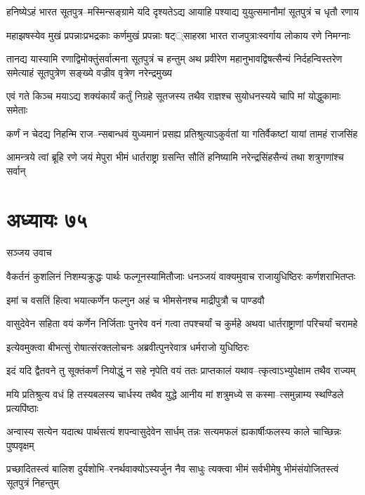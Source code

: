 \twolineshloka
{हनिष्येऽहं भारत सूतपुत्र--मस्मिन्सङ्ग्रामे यदि दृश्यतेऽद्य}
{आयाहि पश्याद्य युयुत्समानौमां सूतपुत्रं च धृतौ रणाय}


\twolineshloka
{महाझषस्येव मुखं प्रपन्नाःप्रभद्रकाः कर्णमुखं प्रपन्नाः}
{षट््साहस्रा भारत राजपुत्राःस्वर्गाय लोकाय रणे निमग्नाः}


तानद्य यास्यामि रणाद्विमोक्तुंसर्वात्मना सूतपुत्रं च हन्तुम्
\twolineshloka
{अथ प्रवीरेण महानुभावद्विषत्सैन्यं निर्दहन्विस्तरेण}
{समेत्याहं सूतपुत्रेण सङ्ख्ये वज्रीव वृत्रेण नरेन्द्रमुख्य}


\twolineshloka
{एवं गते किञ्च मयाऽद्य शक्यंकार्यं कर्तुं निग्रहे सूतजस्य}
{तथैव राज्ञश्च सुयोधनस्यये चापि मां योद्धुकामाः समेताः}


\twolineshloka
{कर्णं न चेदद्य निहन्मि राज--न्सबान्धवं युध्यमानं प्रसह्य}
{प्रतिश्रुत्याऽकुर्वतां या गतिर्वैकष्टां यायां तामहं राजसिंह}


\twolineshloka
{आमन्त्रये त्वां ब्रूहि रणे जयं मेपुरा भीमं धार्तराष्ट्रा ग्रसन्ति}
{सौतिं हनिष्यामि नरेन्द्रसिंहसैन्यं तथा शत्रुगणांश्च सर्वान्}


\chapter{अध्यायः ७५}
\twolineshloka
{सञ्जय उवाच}
{}


\twolineshloka
{वैकर्तनं कुशलिनं निशम्यक्रुद्धः पार्थः फल्गूनस्यामितौजाः}
{धनञ्जयं वाक्यमुवाच राजायुधिष्ठिरः कर्णशराभितप्तः}


\twolineshloka
{इमां च वसतिं हित्वा भयात्कर्णेन फल्गुन}
{अहं च भीमसेनश्च माद्रीपुत्रौ च पाण्डवौ}


\threelineshloka
{वासुदेवेन सहिता वयं कर्णेन निर्जिताः}
{पुनरेव वनं गत्वा तपश्चर्यां च कुर्महे}
{अथवा धार्तराष्ट्राणां परिचर्यां चरामहे}


\twolineshloka
{इत्येवमुक्त्वा बीभत्सुं रोषात्संरक्तलोचनः}
{अब्रवीत्पुनरेवात्र धर्मराजो युधिष्ठिरः}


\twolineshloka
{इदं यदि द्वैतवने तु सूक्तंकर्णं नियोद्धुं न सहे नृपेति}
{वयं ततः प्राप्तकालं यथाव--त्कृत्वाऽभ्युपेक्षाम तथैव राज्यम्}


\twolineshloka
{मयि प्रतिश्रुत्य वधं हि तस्यबलस्य चार्धस्य तथैव युद्धे}
{आनीय मां शत्रुमध्ये स कस्मा--त्समुन्नाम्य स्थण्डिले प्रत्यपिंष्ठाः}


\twolineshloka
{अन्वास्य सत्येन यदात्थ पार्थसत्यं शपन्वासुदेवेन सार्धम्}
{तन्नः सत्यमफलं ह्यकार्षीःफलस्य काले चाच्छिन्नः पुष्पवृक्षम्}


\twolineshloka
{प्रच्छादितस्त्वं बालिश दुर्यशोभि--रनर्थवाक्योऽस्यर्जुन नैव साधुः}
{त्यक्त्वा भीमं सर्वभीमेषु भीमंसंयोजितस्त्वं सूतपुत्रं निहन्तुम्}


